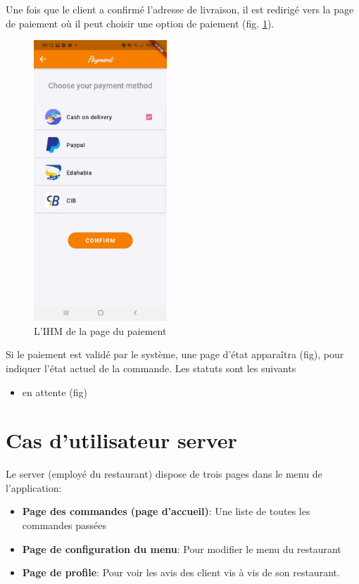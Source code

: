 \documentclass[french, a4paper, 12pt]{report}
\begin{document}
\newpage
Une fois que le client a confirmé l'adresse de livraison, il est redirigé vers la page de paiement où il peut choisir une option de paiement (fig. \ref{fig:clipay}).
		\begin{figure}[h!]
			\center
			\includegraphics[width=5cm]{screenshots/ClientViews/Payment.jpg}
			\caption{L'IHM de la page du paiement}
			\label{fig:clipay}
		\end{figure}

\newpage
Si le paiement est validé par le système, une page d'état apparaîtra (fig), pour indiquer l'état actuel de la commande. Les statuts sont les suivants
\begin{itemize}
	\item en attente (fig)
\end{itemize}



	\newpage
	\section{Cas d'utilisateur server} Le server (employé du restaurant) dispose de trois pages dans le menu de l'application:
		\begin{itemize}
			\item \textbf{Page des commandes (page d'accueil)}: Une liste de toutes les commandes passées
			\item \textbf{Page de configuration du menu}: Pour modifier le menu du restaurant
			\item \textbf{Page de profile}: Pour voir les avis des client vis à vis de son restaurant.
		\end{itemize}
		
\end{document}
